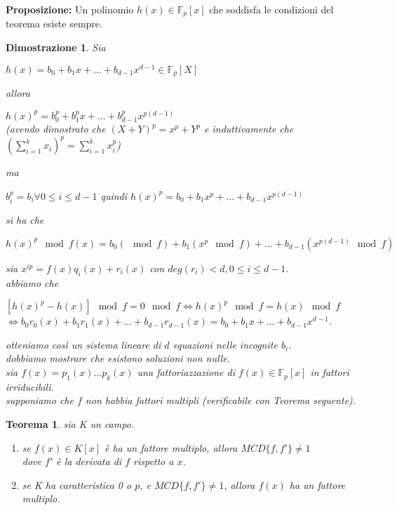\documentclass[a4paper,12pt]{article}
\theoremstyle{def}
\theoremstyle{prop}
\theoremstyle{esempio}
\theoremstyle{dimostrazione}
\newtheorem*{dimostrazione}{Dimostrazione}
\theoremstyle{teo}
\newtheorem*{teorema}{Teorema}
\theoremstyle{osservazione}
\begin{document}
\newpage

\textbf{Proposizione:} Un polinomio \(h(x) \in \mathbb{F}_p[x]\) che soddisfa le condizioni del teorema esiste sempre.\\
\begin{dimostrazione}
    Sia
    \begin{center}
        \(h(x) = b_0 + b_1 x + ... + b_{d - 1} x^{d - 1} \in \mathbb{F}_p[X]\)
    \end{center}
    allora
    \begin{center}
        \(h(x)^p = b_0^p + b_1^p x + ... + b_{d - 1}^p x^{p(d - 1)}\)\\
        (avendo dimostrato che \((X + Y)^p = x^p + Y^p\) e induttivamente che \((\sum_{i=1}^{k} x_i)^p = \sum_{i=1}^{k} x_i^p\))
    \end{center}
    ma
    \begin{center}
        \(b_i^p = b_i \forall 0 \leq i \leq d - 1\) quindi \(h(x)^p = b_0 + b_1 x^p + ... + b_{d - 1} x^{p(d - 1)}\)
    \end{center}
    si ha che
    \begin{center}
        \(h(x)^p \mod f(x) = b_0 (\mod f) + b_1 (x^p \mod f) + ... + b_{d - 1} (x^{p(d - 1)} \mod f)\)
    \end{center}
    sia \(x^{ip} = f(x) q_i(x) + r_i(x)\) con \(deg(r_i) < d, 0 \leq i \leq d - 1\).\\
    abbiamo che
    \begin{center}
        \([h(x)^p - h(x)] \mod f = 0 \mod f \iff h(x)^p \mod f = h(x) \mod f\)\\
        \(\iff b_0 r_0(x) + b_1 r_1(x) + ... + b_{d - 1} r_{d - 1}(x) = b_0 + b_1 x + ... + b_{d - 1} x^{d - 1}\).
    \end{center}
    otteniamo così un sistema lineare di \(d\) equazioni nelle incognite \(b_i\).\\
    dobbiamo mostrare che esistono soluzioni non nulle.\\
    sia \(f(x) = p_1(x) ... p_k(x)\) una fattoriazzazione di \(f(x) \in \mathbb{F}_p[x]\) in fattori irriducibili.\\
    supponiamo che \(f\) non habbia fattori multipli (verificabile con Teorema seguente).\\
\end{dimostrazione}

\begin{teorema}
    sia K un campo.
    \begin{enumerate}
        \item se \(f(x) \in K[x]\) è ha un fattore multiplo, allora \(MCD\{f, f'\} \neq 1\)\\
            dove \(f'\) è la derivata di \(f\) rispetto a \(x\).
        \item se K ha caratteristica 0 o \(p\), e \(MCD\{f, f'\} \neq 1\), allora \(f(x)\) ha un fattore multiplo.
    \end{enumerate}
\end{teorema}
\end{document}
